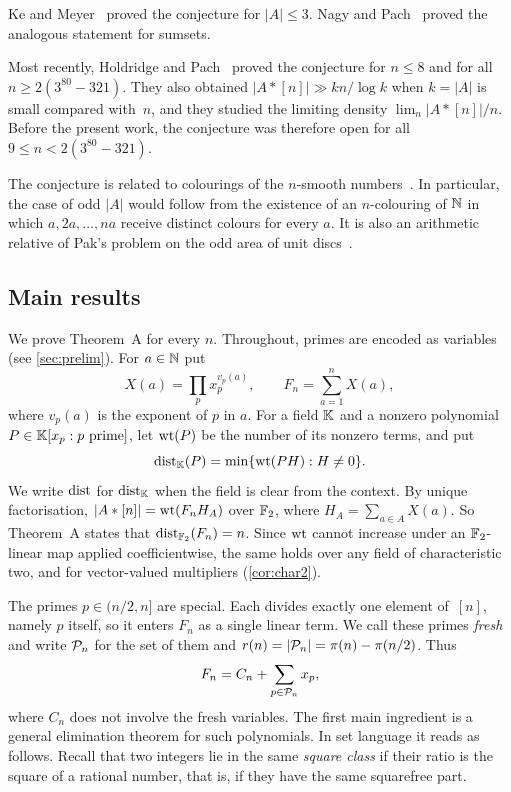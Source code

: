 Ke and Meyer~\cite{KM} proved the conjecture for $|A|\le3$. Nagy and Pach~\cite{NP} proved the analogous statement for sumsets.

Most recently, Holdridge and Pach~\cite{HP} proved the conjecture for $n\le 8$ and for all $n\ge 2(3^{80}-321)$. They also obtained $|A*[n]|\gg kn/\log k$ when $k=|A|$ is small compared with~$n$, and they studied the limiting density $\lim_n|A*[n]|/n$. Before the present work, the conjecture was therefore open for all $9\le n<2(3^{80}-321)$.

The conjecture is related to colourings of the $n$-smooth numbers~\cite{CCP}. In particular, the case of odd $|A|$ would follow from the existence of an $n$-colouring of $\mathbb{N}$ in which $a,2a,\dots,na$ receive distinct colours for every $a$. It is also an arithmetic relative of Pak's problem on the odd area of unit discs~\cite{Pak,Pinchasi}.

\subsection{Main results}
We prove Theorem~A for every $n$. Throughout, primes are encoded as variables (see \cref{sec:prelim}). For $a\in\mathbb{N}$ put
\[
 X(a)=\prod_p x_p^{v_p(a)},\qquad F_n=\sum_{a=1}^nX(a),
\]
where $v_p(a)$ is the exponent of $p$ in $a$.
For a field $\mathbb{K}$ and a nonzero polynomial $P\in\mathbb{K}[x_p:p\text{ prime}]$, let $\operatorname{wt}(P)$ be the number of its nonzero terms, and put
\[
 \operatorname{dist}_{\mathbb{K}}(P)=\min\{\operatorname{wt}(PH):H\ne0\}.
\]
We write $\operatorname{dist}$ for $\operatorname{dist}_{\mathbb{K}}$ when the field is clear from the context.
By unique factorisation, $|A*[n]|=\operatorname{wt}(F_nH_A)$ over $\mathbb{F}_2$, where $H_A=\sum_{a\in A}X(a)$. So Theorem~A states that $\operatorname{dist}_{\mathbb{F}_2}(F_n)=n$. Since $\operatorname{wt}$ cannot increase under an $\mathbb{F}_2$-linear map applied coefficientwise, the same holds over any field of characteristic two, and for vector-valued multipliers (\cref{cor:char2}).

The primes $p\in(n/2,n]$ are special. Each divides exactly one element of~$[n]$, namely $p$ itself, so it enters $F_n$ as a single linear term. We call these primes \emph{fresh} and write $\mathcal{P}_n$ for the set of them and $r(n)=|\mathcal{P}_n|=\pi(n)-\pi(n/2)$. Thus
\[
 F_n=C_n+\sum_{p\in\mathcal{P}_n}x_p,
\]
where $C_n$ does not involve the fresh variables. The first main ingredient is a general elimination theorem for such polynomials. In set language it reads as follows. Recall that two integers lie in the same \emph{square class} if their ratio is the square of a rational number, that is, if they have the same squarefree part.

